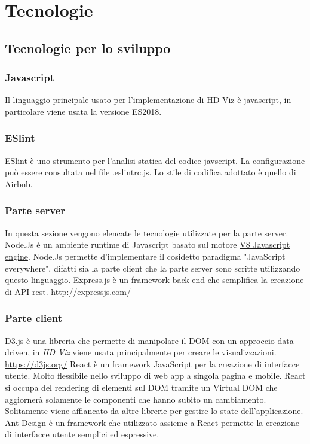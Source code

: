 \section{Tecnologie}
    \subsection{Tecnologie per lo sviluppo}
    \subsubsection{Javascript}
        Il linguaggio principale usato per l'implementazione di HD Viz è javascript, in particolare viene usata la versione ES2018.
    \subsubsection{ESlint}
        ESlint è uno strumento per l'analisi statica del codice javscript. La configurazione può essere consultata nel file .eslintrc.js. Lo stile di codifica adottato è quello di Airbnb.
    \subsubsection{Parte server}
    In questa sezione vengono elencate le tecnologie utilizzate per la parte server.
        Node.Js è un ambiente runtime di Javascript basato sul motore \href{https://v8.dev/}{V8 Javascript engine}. Node.Js permette d'implementare il cosidetto paradigma "JavaScript everywhere", difatti sia la parte client che la parte server sono scritte utilizzando questo linguaggio.
        Express.js è un framework back end che semplifica la creazione di API rest.
        \url{http://expressjs.com/}
    \subsubsection{Parte client}
        D3.js è una libreria che permette di manipolare il DOM con un approccio data-driven, in \textit{HD Viz} viene usata principalmente per creare le visualizzazioni.
        \url{https://d3js.org/}
        React è un framework JavaScript per la creazione di interfacce utente. Molto flessibile nello sviluppo di web app a singola pagina e mobile. React si occupa del rendering di elementi sul DOM tramite un Virtual DOM che aggiornerà  solamente le componenti che hanno subito un cambiamento. Solitamente viene affiancato da altre librerie per gestire lo state dell'applicazione.
        Ant Design è un framework che utilizzato assieme a React permette la creazione di interfacce utente semplici ed espressive.

